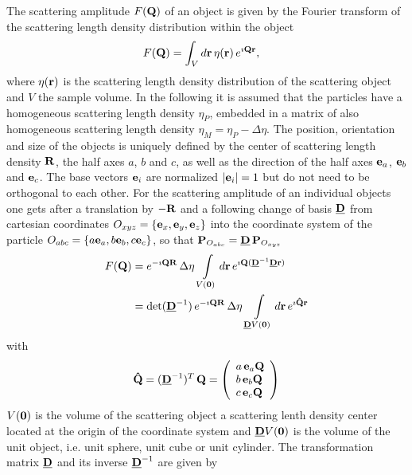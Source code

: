 The scattering amplitude $F(\B{Q})$ of an object is given by the Fourier transform of the scattering length density distribution within the object
\begin{align}
F(\B{Q}) &= \int_V d\B{r}\, \eta(\B{r})\, e^{\imath \B{Qr}},
\end{align}
where $\eta(\B{r})$ is the scattering length density distribution of the scattering object and $V$ the sample volume.
In the following it is assumed that the particles have a homogeneous scattering length density
$\eta_P$, embedded in a matrix of also homogeneous scattering length density $\eta_M = \eta_P-\Delta\eta$.
The position, orientation and size of the objects is uniquely defined by the center of scattering length density $\B{R}$, the half axes $a$, $b$ and $c$, as well as the direction of the half axes $\B{e}_a$, $\B{e}_b$ and
$\B{e}_c$. The base vectors $\B{e}_i$ are normalized $\abs{\B{e}_i}=1$ but do not need to be orthogonal to each other.  For the scattering amplitude of an individual objects one gets after a translation by $-\B{R}$ and a following change of basis $\M{D}$ from cartesian coordinates
$O_{xyz} = \{\B{e}_x, \B{e}_y,\B{e}_z\}$
into the coordinate system of the particle $O_{abc}=\{a\B{e}_a, b\B{e}_b,
c\B{e}_c\}$, so that $\B{P}_{O_{abc}} = \M{D}\, \B{P}_{O_{xyz}}$
\begin{align}
F(\B{Q}) &=
e^{-\imath\B{QR}}\, \Delta\eta\,
\int\limits_{V(\B{0})} d\B{r}\, e^{\imath\B{Q}(\M{D}^{-1}\M{D}\B{r})}\\
&=
\det(\M{D}^{-1})\, e^{-\imath\B{QR}}\, \Delta\eta\,
\int\limits_{\M{D} V(\B{0})} d\B{r}\, e^{\imath \B{\hat{Q}}\B{r}}
\end{align}
with
\begin{align}
\displaystyle \B{\hat{Q}} = (\M{D}^{-1})^T\,\B{Q}
= \left( \begin{array}{l} a\,\B{e}_a\B{Q}\\ b\,\B{e}_b\B{Q}\\
c\, \B{e}_c\B{Q}
\end{array}\right)
\label{eq:Q:dach}
\end{align}
$V(\B{0})$ is the volume of the scattering object a scattering lenth density center located at the origin of the coordinate system and $\M{D} V(\B{0})$ is the volume of the unit object, i.e. unit sphere, unit cube or unit cylinder.
The transformation matrix $\M{D}$ and its inverse $\M{D}^{-1}$ are given by
